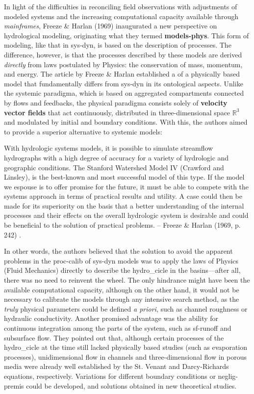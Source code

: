 \documentclass[./main_en.tex]{subfiles}
\begin{document}
\par In light of the difficulties in reconciling field observations with adjustments of modeled systems and the increasing computational capacity available through \textit{mainframes}, Freeze \& Harlan (1969) inaugurated a new perspective on hydrological modeling, originating what they termed \textbf{\gls{models-phys}}. This form of modeling, like that in \gls{sys-dyn}, is based on the description of processes. The difference, however, is that the processes described by these models are derived \textit{directly} from laws postulated by Physics: the conservation of mass, momentum, and energy. The article by Freeze \& Harlan established a  of a physically based \gls{model} that fundamentally differs from \gls{sys-dyn} in its ontological aspects. Unlike the systemic \gls{paradigma}, which is based on aggregated compartments connected by flows and feedbacks, the physical \gls{paradigma} consists solely of \textbf{velocity vector fields} that act continuously, distributed in three-dimensional space $\mathbb{R}^3$ and modulated by initial and boundary conditions. With this, the authors aimed to provide a superior alternative to systemic models:
\begin{adjustwidth}{100pt}{0pt}
\medskip
\small
With hydrologic systems models, it is possible to simulate streamflow hydrographs with a high degree of accuracy for a variety of hydrologic and geographic conditions. The Stanford Watershed Model IV (Crawford and Linsley), is the best-known and most successful model of this type. If the model we espouse is to offer promise for the future, it must be able to compete with the systems approach in terms of practical results and utility. A case could then be made for its superiority on the basis that a better understanding of the internal processes and their effects on the overall hydrologic system is desirable and could be beneficial to the solution of practical problems. -- Freeze \& Harlan (1969, p. 242) \cite{Freeze1969a}.
\medskip
\end{adjustwidth}
\noindent In other words, the authors believed that the solution to avoid the apparent problems in the \gls{proc-calib} of \gls{sys-dyn} models was to apply the laws of Physics (Fluid Mechanics) directly to describe the \gls{hydro_cicle} in the basins—after all, there was no need to reinvent the wheel. The only hindrance might have been the available computational capacity, although on the other hand, it would not be necessary to calibrate the models through any intensive search method, as the \textit{truly} physical \gls{parameters} could be defined \textit{a priori}, such as channel roughness or hydraulic conductivity. Another promised advantage was the ability for continuous integration among the parts of the \gls{system}, such as \gls{sf-runoff} and subsurface flow. They pointed out that, although certain processes of the \gls{hydro_cicle} at the time still lacked physically based studies (such as evaporation processes), unidimensional flow in channels and three-dimensional flow in porous media were already well established by the St. Venant and Darcy-Richards equations, respectively. Variations for different boundary conditions or \gls{neglig-premis} could be developed, and solutions obtained in new theoretical studies.
\end{document}
